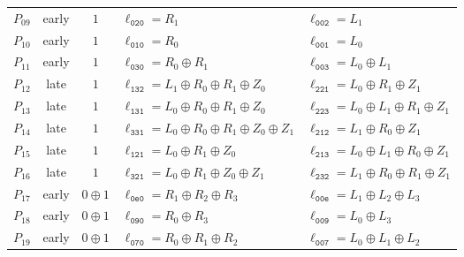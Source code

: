 \begin{longtable}{@{}rcc>{\raggedright\arraybackslash}p{}>{\raggedright\arraybackslash}p{}@{}}
$P_{09}$ & early & $1$ & $\ell_{\mathtt{020}}=R_1$ & $\ell_{\mathtt{002}}=L_1$ \\
$P_{10}$ & early & $1$ & $\ell_{\mathtt{010}}=R_0$ & $\ell_{\mathtt{001}}=L_0$ \\
$P_{11}$ & early & $1$ & $\ell_{\mathtt{030}}=R_0\mathbin{\oplus}\allowbreak R_1$ & $\ell_{\mathtt{003}}=L_0\mathbin{\oplus}\allowbreak L_1$ \\
$P_{12}$ & late & $1$ & $\ell_{\mathtt{132}}=L_1\mathbin{\oplus}\allowbreak R_0\mathbin{\oplus}\allowbreak R_1\mathbin{\oplus}\allowbreak Z_0$ & $\ell_{\mathtt{221}}=L_0\mathbin{\oplus}\allowbreak R_1\mathbin{\oplus}\allowbreak Z_1$ \\
$P_{13}$ & late & $1$ & $\ell_{\mathtt{131}}=L_0\mathbin{\oplus}\allowbreak R_0\mathbin{\oplus}\allowbreak R_1\mathbin{\oplus}\allowbreak Z_0$ & $\ell_{\mathtt{223}}=L_0\mathbin{\oplus}\allowbreak L_1\mathbin{\oplus}\allowbreak R_1\mathbin{\oplus}\allowbreak Z_1$ \\
$P_{14}$ & late & $1$ & $\ell_{\mathtt{331}}=L_0\mathbin{\oplus}\allowbreak R_0\mathbin{\oplus}\allowbreak R_1\mathbin{\oplus}\allowbreak Z_0\mathbin{\oplus}\allowbreak Z_1$ & $\ell_{\mathtt{212}}=L_1\mathbin{\oplus}\allowbreak R_0\mathbin{\oplus}\allowbreak Z_1$ \\
$P_{15}$ & late & $1$ & $\ell_{\mathtt{121}}=L_0\mathbin{\oplus}\allowbreak R_1\mathbin{\oplus}\allowbreak Z_0$ & $\ell_{\mathtt{213}}=L_0\mathbin{\oplus}\allowbreak L_1\mathbin{\oplus}\allowbreak R_0\mathbin{\oplus}\allowbreak Z_1$ \\
$P_{16}$ & late & $1$ & $\ell_{\mathtt{321}}=L_0\mathbin{\oplus}\allowbreak R_1\mathbin{\oplus}\allowbreak Z_0\mathbin{\oplus}\allowbreak Z_1$ & $\ell_{\mathtt{232}}=L_1\mathbin{\oplus}\allowbreak R_0\mathbin{\oplus}\allowbreak R_1\mathbin{\oplus}\allowbreak Z_1$ \\
$P_{17}$ & early & $0\mathbin{\oplus}1$ & $\ell_{\mathtt{0e0}}=R_1\mathbin{\oplus}\allowbreak R_2\mathbin{\oplus}\allowbreak R_3$ & $\ell_{\mathtt{00e}}=L_1\mathbin{\oplus}\allowbreak L_2\mathbin{\oplus}\allowbreak L_3$ \\
$P_{18}$ & early & $0\mathbin{\oplus}1$ & $\ell_{\mathtt{090}}=R_0\mathbin{\oplus}\allowbreak R_3$ & $\ell_{\mathtt{009}}=L_0\mathbin{\oplus}\allowbreak L_3$ \\
$P_{19}$ & early & $0\mathbin{\oplus}1$ & $\ell_{\mathtt{070}}=R_0\mathbin{\oplus}\allowbreak R_1\mathbin{\oplus}\allowbreak R_2$ & $\ell_{\mathtt{007}}=L_0\mathbin{\oplus}\allowbreak L_1\mathbin{\oplus}\allowbreak L_2$ \\

\end{longtable}
